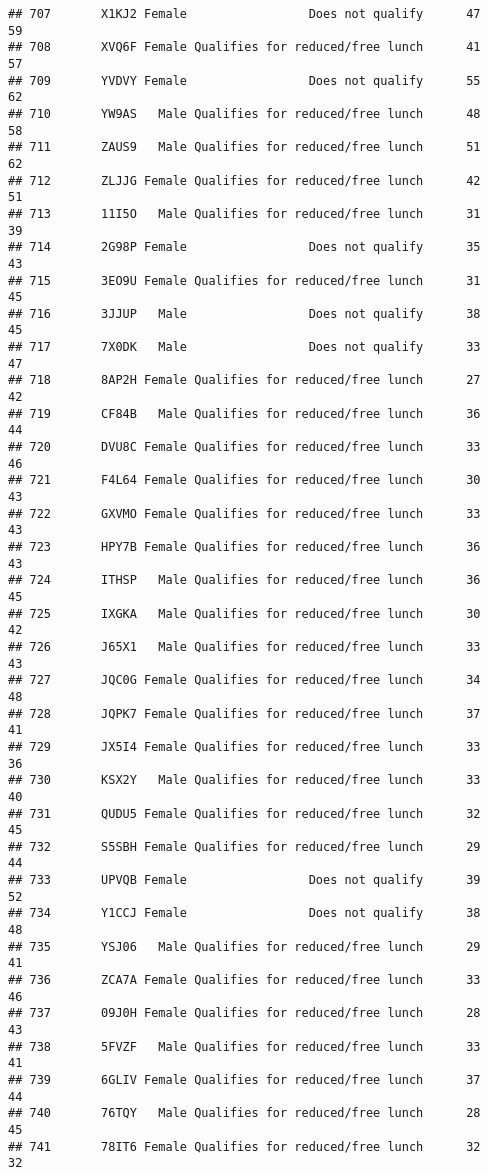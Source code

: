 \documentclass[
]{article}
\begin{document}
\begin{verbatim}
## 707       X1KJ2 Female                 Does not qualify      47       59
## 708       XVQ6F Female Qualifies for reduced/free lunch      41       57
## 709       YVDVY Female                 Does not qualify      55       62
## 710       YW9AS   Male Qualifies for reduced/free lunch      48       58
## 711       ZAUS9   Male Qualifies for reduced/free lunch      51       62
## 712       ZLJJG Female Qualifies for reduced/free lunch      42       51
## 713       11I5O   Male Qualifies for reduced/free lunch      31       39
## 714       2G98P Female                 Does not qualify      35       43
## 715       3EO9U Female Qualifies for reduced/free lunch      31       45
## 716       3JJUP   Male                 Does not qualify      38       45
## 717       7X0DK   Male                 Does not qualify      33       47
## 718       8AP2H Female Qualifies for reduced/free lunch      27       42
## 719       CF84B   Male Qualifies for reduced/free lunch      36       44
## 720       DVU8C Female Qualifies for reduced/free lunch      33       46
## 721       F4L64 Female Qualifies for reduced/free lunch      30       43
## 722       GXVMO Female Qualifies for reduced/free lunch      33       43
## 723       HPY7B Female Qualifies for reduced/free lunch      36       43
## 724       ITHSP   Male Qualifies for reduced/free lunch      36       45
## 725       IXGKA   Male Qualifies for reduced/free lunch      30       42
## 726       J65X1   Male Qualifies for reduced/free lunch      33       43
## 727       JQC0G Female Qualifies for reduced/free lunch      34       48
## 728       JQPK7 Female Qualifies for reduced/free lunch      37       41
## 729       JX5I4 Female Qualifies for reduced/free lunch      33       36
## 730       KSX2Y   Male Qualifies for reduced/free lunch      33       40
## 731       QUDU5 Female Qualifies for reduced/free lunch      32       45
## 732       S5SBH Female Qualifies for reduced/free lunch      29       44
## 733       UPVQB Female                 Does not qualify      39       52
## 734       Y1CCJ Female                 Does not qualify      38       48
## 735       YSJ06   Male Qualifies for reduced/free lunch      29       41
## 736       ZCA7A Female Qualifies for reduced/free lunch      33       46
## 737       09J0H Female Qualifies for reduced/free lunch      28       43
## 738       5FVZF   Male Qualifies for reduced/free lunch      33       41
## 739       6GLIV Female Qualifies for reduced/free lunch      37       44
## 740       76TQY   Male Qualifies for reduced/free lunch      28       45
## 741       78IT6 Female Qualifies for reduced/free lunch      32       32

\end{verbatim}
\end{document}
